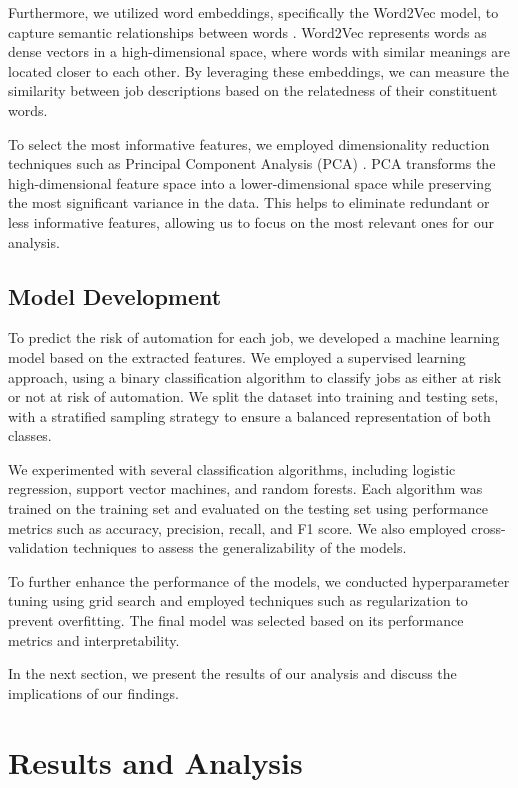 \documentclass{article}
\begin{document}
Furthermore, we utilized word embeddings, specifically the Word2Vec model, to capture semantic relationships between words \cite{mikolov2013distributed}. Word2Vec represents words as dense vectors in a high-dimensional space, where words with similar meanings are located closer to each other. By leveraging these embeddings, we can measure the similarity between job descriptions based on the relatedness of their constituent words.

To select the most informative features, we employed dimensionality reduction techniques such as Principal Component Analysis (PCA) \cite{jolliffe2016principal}. PCA transforms the high-dimensional feature space into a lower-dimensional space while preserving the most significant variance in the data. This helps to eliminate redundant or less informative features, allowing us to focus on the most relevant ones for our analysis.

\subsection{Model Development}

To predict the risk of automation for each job, we developed a machine learning model based on the extracted features. We employed a supervised learning approach, using a binary classification algorithm to classify jobs as either at risk or not at risk of automation. We split the dataset into training and testing sets, with a stratified sampling strategy to ensure a balanced representation of both classes.

We experimented with several classification algorithms, including logistic regression, support vector machines, and random forests. Each algorithm was trained on the training set and evaluated on the testing set using performance metrics such as accuracy, precision, recall, and F1 score. We also employed cross-validation techniques to assess the generalizability of the models.

To further enhance the performance of the models, we conducted hyperparameter tuning using grid search and employed techniques such as regularization to prevent overfitting. The final model was selected based on its performance metrics and interpretability.

In the next section, we present the results of our analysis and discuss the implications of our findings.

\section{Results and Analysis}
\end{document}
